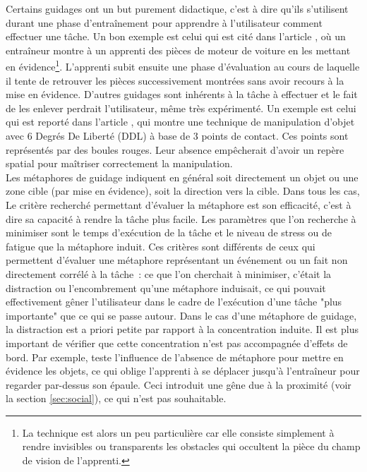 \documentclass[11pt]{article}
\begin{document}
Certains guidages ont un but purement didactique, c'est à dire qu'ils s'utilisent durant une phase d'entraînement pour apprendre à l'utilisateur comment effectuer une tâche. Un bon exemple est celui qui est cité dans l'article \cite{show-through}, où un entraîneur montre à un apprenti des pièces de moteur de voiture en les mettant en évidence\footnote{La technique est alors un peu particulière car elle consiste simplement à rendre invisibles ou transparents les obstacles qui occultent la pièce du champ de vision de l'apprenti.}. L'apprenti subit ensuite une phase d'évaluation au cours de laquelle il tente de retrouver les pièces successivement montrées sans avoir recours à la mise en évidence. D'autres guidages sont inhérents à la tâche à effectuer et le fait de les enlever perdrait l'utilisateur, même très expérimenté. Un exemple est celui qui est reporté dans l'article \cite{3-hand}, qui montre une technique de manipulation d'objet avec 6 Degrés De Liberté (DDL) à base de 3 points de contact. Ces points sont représentés par des boules rouges. Leur absence empêcherait d'avoir un repère spatial pour maîtriser correctement la manipulation.
\\

Les métaphores de guidage indiquent en général soit directement un objet ou une zone cible (par mise en évidence), soit la direction vers la cible. Dans tous les cas, Le critère recherché permettant d'évaluer la métaphore est son efficacité, c'est à dire sa capacité à rendre la tâche plus facile. Les paramètres que l'on recherche à minimiser sont le temps d'exécution de la tâche et le niveau de stress ou de fatigue que la métaphore induit. Ces critères sont différents de ceux qui permettent d'évaluer une métaphore représentant un événement ou un fait non directement corrélé à la tâche~: ce que l'on cherchait à minimiser, c'était la distraction ou l'encombrement qu'une métaphore induisait, ce qui pouvait effectivement gêner l'utilisateur dans le cadre de l'exécution d'une tâche "plus importante" que ce qui se passe autour. Dans le cas d'une métaphore de guidage, la distraction est a priori petite par rapport à la concentration induite. Il est plus important de vérifier que cette concentration n'est pas accompagnée d'effets de bord. Par exemple, \cite{show-through} teste l'influence de l'absence de métaphore pour mettre en évidence les objets, ce qui oblige l'apprenti à se déplacer jusqu'à l'entraîneur pour regarder par-dessus son épaule. Ceci introduit une gêne due à la proximité (voir la section \ref{sec:social}), ce qui n'est pas souhaitable.
\\
\end{document}
